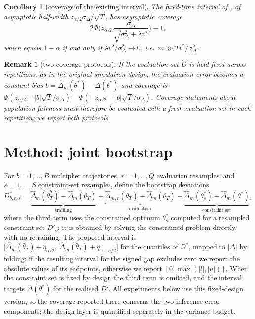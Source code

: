 \documentclass[pdflatex,sn-basic]{sn-jnl}
\newtheorem{corollary}{Corollary}
\newtheorem{remark}{Remark}
\newcommand{\dhat}{\hat\Delta}
\newcommand{\tbar}{\bar\theta}
\newcommand{\Dp}{D'}
\newcommand{\Dt}{\tilde D}
\begin{document}
\begin{corollary}[coverage of the existing interval]
\label{cor:coverage}
The fixed-time interval of \citet{roy2026uq}, of asymptotic half-width
$z_{\alpha/2}\sigma_\Delta/\sqrt T$, has asymptotic coverage
\[
2\Phi\!\Big(z_{\alpha/2}\,\frac{\sigma_\Delta}{\sqrt{\sigma^2_\Delta+\lambda v^2}}\Big)-1,
\]
which equals $1-\alpha$ if and only if $\lambda v^2/\sigma_\Delta^2\to0$, i.e.\
$m\gg T v^2/\sigma_\Delta^2$.
\end{corollary}

\begin{remark}[two coverage protocols]
\label{rem:protocol}
If the evaluation set $\Dt$ is held fixed across repetitions, as in the original simulation design,
the evaluation error becomes a constant bias $b=\dhat_m(\theta^*)-\Delta(\theta^*)$ and coverage is
$\Phi(z_{\alpha/2}-|b|\sqrt T/\sigma_\Delta)-\Phi(-z_{\alpha/2}-|b|\sqrt T/\sigma_\Delta)$.
Coverage statements about population fairness must therefore be evaluated with a fresh evaluation
set in each repetition; we report both protocols.
\end{remark}

\section{Method: joint bootstrap}
\label{sec:method}

For $b=1,\dots,B$ multiplier trajectories, $r=1,\dots,Q$ evaluation resamples, and $s=1,\dots,S$ constraint-set resamples, define the bootstrap deviations
\[
D^*_{b,r,s}
= \underbrace{\dhat_m(\bar\theta^b_T)-\dhat_m(\tbar_T)}_{\text{training}}
+ \underbrace{\dhat_{m,r}(\tbar_T)-\dhat_m(\tbar_T)}_{\text{evaluation}}
+ \underbrace{\dhat_{m}(\theta^*_s)-\dhat_m(\theta^*)}_{\text{constraint set}} ,
\]
where the third term uses the constrained optimum $\theta^*_s$ computed for a resampled constraint
set $\Dp_s$; it is obtained by solving the constrained problem directly, with no retraining.
The proposed interval is
$\big[\dhat_m(\tbar_T)+\hat q_{\alpha/2},\ \dhat_m(\tbar_T)+\hat q_{1-\alpha/2}\big]$
for the quantiles of $D^*$, mapped to $|\Delta|$ by folding: if the resulting interval for the signed
gap excludes zero we report the absolute values of its endpoints, otherwise we report
$[0,\max(|l|,|u|)]$.  When the constraint set is fixed by design the third term is omitted, and the interval targets
$\Delta(\theta^*)$ for the realised $\Dp$.  All experiments below use this fixed-design version, so
the coverage reported there concerns the two inference-error components; the design layer is
quantified separately in the variance budget.
\end{document}

